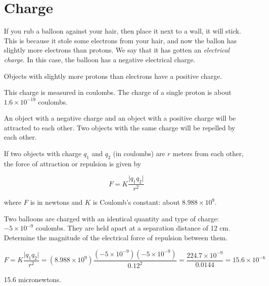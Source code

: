 \chapter{Charge}

If you rub a balloon against your hair, then place it next to a wall, it will stick. This is because it stole some
electrons from your hair, and now the ballon has slightly more
electrons than protons. We say that it has gotten an \textit{electrical charge}. In this case, the balloon has a negative electrical
charge.

Objects with slightly more protons than electrons have a positive charge.

This charge is measured in coulombs. The charge of a single proton is
about $1.6 \times 10^{-19}$ coulombs.

An object with a negative charge and an object with a positive charge
will be attracted to each other. Two objects with the same charge will
be repelled by each other.

\begin{mdframed}[style=important, frametitle={Coulomb's Law}]

  If two objects with charge $q_1$ and $q_2$ (in coulombs) are $r$ meters from each other, the force of attraction or repulsion is given by

  $$F = K\frac{\lvert q_1 q_2 \rvert}{r^2}$$

    where $F$ is in newtons and $K$ is Coulomb's constant: about $8.988 \times 10^9$.
  
\end{mdframed}


\begin{Exercise}[title={Coulomb's Law}, label=charged_balloons]

Two balloons are charged with an identical quantity and type of
charge: $-5 \times 10^{-9}$ coulombs. They are held apart at a
separation distance of 12 cm. Determine the magnitude of the
electrical force of repulsion between them. 
  
\end{Exercise}
\begin{Answer}[ref=charged_balloons]

  $$F = K\frac{\lvert q_1 q_2 \rvert}{r^2} = (8.988 \times 10^9) \frac{(-5 \times 10^{-9})(-5 \times 10^{-9})}{0.12^2} = \frac{224.7 \times 10^{-9}}{0.0144} = 15.6 \times 10^{-6}$$

  15.6 micronewtons.
  
\end{Answer}

